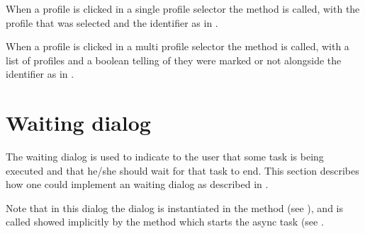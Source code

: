 

\noindent
When a profile is clicked in a single profile selector the  method is called, with the profile that was selected and the identifier  as in .



\noindent
When a profile is clicked in a multi profile selector the  method is called, with a list of profiles and a boolean telling of they were marked or not alongside the identifier  as in .

\section{Waiting dialog}
\label{sec:impl_waiting_dialog}

The waiting dialog is used to indicate to the user that some task is being executed and that he/she should wait for that task to end. This section describes how one could implement an waiting dialog as described in .

\begin{note}
    Note that in this dialog the dialog is instantiated in the  method (see ), and is called showed implicitly by the  method which starts the async task (see .
\end{note}

